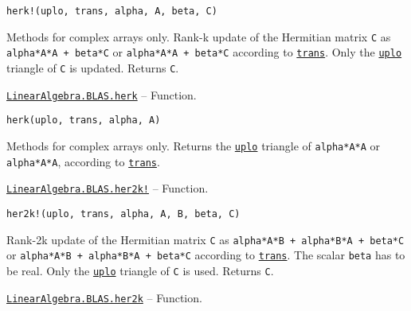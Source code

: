 \begin{adjustwidth}{2em}{0pt}


\begin{verbatim}
herk!(uplo, trans, alpha, A, beta, C)
\end{verbatim}

Methods for complex arrays only. Rank-k update of the Hermitian matrix \texttt{C} as \texttt{alpha*A*A{\textquotesingle} + beta*C} or \texttt{alpha*A{\textquotesingle}*A + beta*C} according to \hyperlink{15951037910221396131}{\texttt{trans}}. Only the \hyperlink{13880289478825450693}{\texttt{uplo}} triangle of \texttt{C} is updated. Returns \texttt{C}.



\end{adjustwidth}
\hypertarget{10248669546555807730}{} 
\hyperlink{10248669546555807730}{\texttt{LinearAlgebra.BLAS.herk}}  -- {Function.}

\begin{adjustwidth}{2em}{0pt}


\begin{verbatim}
herk(uplo, trans, alpha, A)
\end{verbatim}

Methods for complex arrays only. Returns the \hyperlink{13880289478825450693}{\texttt{uplo}} triangle of \texttt{alpha*A*A{\textquotesingle}} or \texttt{alpha*A{\textquotesingle}*A}, according to \hyperlink{15951037910221396131}{\texttt{trans}}.



\end{adjustwidth}
\hypertarget{7429214484576657213}{} 
\hyperlink{7429214484576657213}{\texttt{LinearAlgebra.BLAS.her2k!}}  -- {Function.}

\begin{adjustwidth}{2em}{0pt}


\begin{verbatim}
her2k!(uplo, trans, alpha, A, B, beta, C)
\end{verbatim}

Rank-2k update of the Hermitian matrix \texttt{C} as \texttt{alpha*A*B{\textquotesingle} + alpha*B*A{\textquotesingle} + beta*C} or \texttt{alpha*A{\textquotesingle}*B + alpha*B{\textquotesingle}*A + beta*C} according to \hyperlink{15951037910221396131}{\texttt{trans}}. The scalar \texttt{beta} has to be real. Only the \hyperlink{13880289478825450693}{\texttt{uplo}} triangle of \texttt{C} is used. Returns \texttt{C}.



\end{adjustwidth}
\hypertarget{1414422633857793327}{} 
\hyperlink{1414422633857793327}{\texttt{LinearAlgebra.BLAS.her2k}}  -- {Function.}

